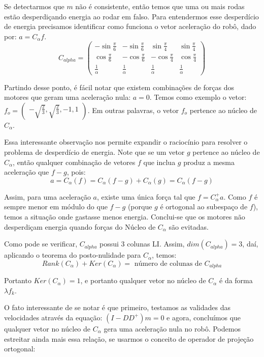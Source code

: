 \documentclass{article}
\begin{document}
\hspace{1cm}Se detectarmos que $m$ não é consistente, então temos que uma ou mais rodas estão desperdiçando energia ao rodar em falso. Para entendermos esse desperdício de energia precisamos identificar como funciona o vetor aceleração do robô, dado por: $ a = C_{\alpha}f$.
\[C_{alpha}
=
\begin{pmatrix}
  -\sin{\frac{\pi}{6}} & -\sin{\frac{\pi}{6}} & \sin{\frac{\pi}{4}} & \sin{\frac{\pi}{4}} \\
  \cos{\frac{\pi}{6}} &  -\cos{\frac{\pi}{6}} &  -\cos{\frac{\pi}{4}} &  \cos{\frac{\pi}{4}} \\
 \frac{1}{\alpha} & \frac{1}{\alpha} &\frac{1}{\alpha} & \frac{1}{\alpha}
 \end{pmatrix}
\]

Partindo desse ponto, é fácil notar que existem combinações de forças dos motores que geram uma aceleração nula: $ a = 0 $. Temos como exemplo o vetor: $f_{o} = \begin{pmatrix} -\sqrt{\frac{2}{3}},\sqrt{\frac{2}{3}},-1,1\end{pmatrix}$. Em outras palavras, o vetor $f_{o}$ pertence ao núcleo de $C_{\alpha}$.

Essa interessante observação nos permite expandir o raciocínio para resolver o problema de desperdício de energia. Note que se um vetor $g$ pertence ao núcleo de $C_{\alpha}$, então qualquer combinação de vetores $f$ que inclua $g$ produz a mesma aceleração que $f - g$, pois:
\[ a = C_{\alpha}(f) = C_{\alpha}(f-g) + C_{\alpha}(g) = C_{\alpha}(f-g)\]

Assim, para uma aceleração $a$, existe uma única força tal que $f=C_{\alpha}^+a$. Como $f$ é sempre menor em módulo do que $f-g$ (porque $g$ é ortogonal ao subespaço de $f$), temos a situação onde gastasse menos energia. Conclui-se que os motores não desperdiçam energia quando forças do Núcleo de $C_{\alpha}$ são evitadas.

Como pode se verificar, $C_{alpha}$ possui 3 colunas LI. Assim, $dim(C_{alpha}) = 3$, daí, aplicando o teorema do posto-nulidade para $C_{\alpha}$, temos:
\[Rank(C_{\alpha}) + Ker(C_{\alpha}) = \text{ número de colunas de }C_{alpha}\]


Portanto $Ker(C_{\alpha}) = 1 $, e portanto qualquer vetor no núcleo de $C_{\alpha}$ é da forma $\lambda f_{k}$.

O fato interessante de se notar é que primeiro, testamos as validades das velocidades através da equação: $(I-DD^+)m = 0$ e agora, concluímos que qualquer vetor no núcleo de $C_{\alpha}$ gera uma aceleração nula no robô. Podemos estreitar ainda mais essa relação, se usarmos o conceito de operador de projeção ortogonal:
\end{document}
